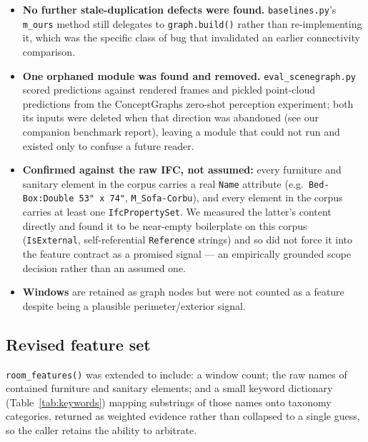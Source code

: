 \documentclass[11pt,a4paper]{article}
\begin{document}
\begin{itemize}
\item \textbf{No further stale-duplication defects were found.}
\texttt{baselines.py}'s \texttt{m\_ours} method still delegates to
\texttt{graph.build()} rather than re-implementing it, which was the specific
class of bug that invalidated an earlier connectivity comparison.
\item \textbf{One orphaned module was found and removed.}
\texttt{eval\_scenegraph.py} scored predictions against rendered frames and
pickled point-cloud predictions from the ConceptGraphs zero-shot perception
experiment; both its inputs were deleted when that direction was abandoned
(see our companion benchmark report), leaving a module that could not run and
existed only to confuse a future reader.
\item \textbf{Confirmed against the raw IFC, not assumed:} every furniture and
sanitary element in the corpus carries a real \texttt{Name} attribute (e.g.\
\texttt{Bed-Box:Double 53" x 74"}, \texttt{M\_Sofa-Corbu}), and every element
in the corpus carries at least one \texttt{IfcPropertySet}. We measured the
latter's content directly and found it to be near-empty boilerplate on this
corpus (\texttt{IsExternal}, self-referential \texttt{Reference} strings) and
so did not force it into the feature contract as a promised signal --- an
empirically grounded scope decision rather than an assumed one.
\item \textbf{Windows} are retained as graph nodes but were not counted as a
feature despite being a plausible perimeter/exterior signal.
\end{itemize}

\subsection{Revised feature set}

\texttt{room\_features()} was extended to include: a window count; the raw
names of contained furniture and sanitary elements; and a small keyword
dictionary (Table~\ref{tab:keywords}) mapping substrings of those names onto
taxonomy categories, returned as weighted evidence rather than collapsed to a
single guess, so the caller retains the ability to arbitrate.
\end{document}
